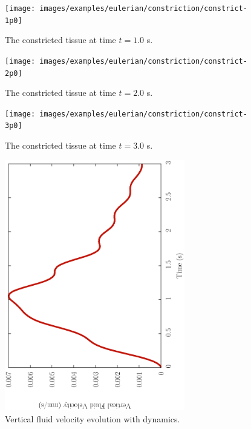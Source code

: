 \begin{figure}[!hpt]
\centering
\texttt{[image: images/examples/eulerian/constriction/constrict-1p0]}
\caption{The constricted tissue at time $t=1.0$ s.} 
\label{constrict-image-1p0}
\end{figure}

\begin{figure}[!hpt]
\centering
\texttt{[image: images/examples/eulerian/constriction/constrict-2p0]}
\caption{The constricted tissue at time $t=2.0$ s.} 
\label{constrict-image-2p0}
\end{figure}

\begin{figure}[!hpt]
\centering
\texttt{[image: images/examples/eulerian/constriction/constrict-3p0]}
\caption{The constricted tissue at time $t=3.0$ s.} 
\label{constrict-image-3p0}
\end{figure}

\begin{figure}[!hpt]
\centering
\includegraphics[width=0.7\textwidth,angle=270]{images/examples/eulerian/constriction/constrict-vel-drop-dynamic}
\caption{Vertical fluid velocity evolution with dynamics.} 
\label{velocity-evolution-dynamic}
\end{figure}

